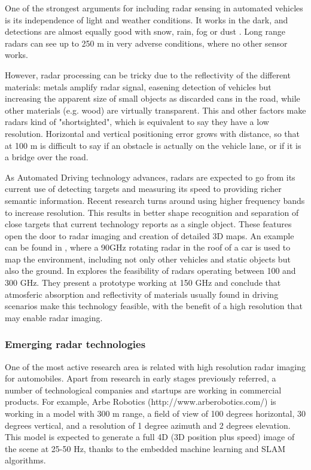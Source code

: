 One of the strongest arguments for including radar sensing in automated 
vehicles is its independence of light and weather conditions. 
It works in the dark, and detections are almost equally good with snow, 
rain, fog or dust \cite{Reina2015}. Long range radars can see up to 250 m
in very adverse conditions, where no other sensor works.

However, radar processing can be tricky due to the reflectivity of the
different materials: metals amplify radar signal, easening detection of 
vehicles but increasing the apparent size of small objects as discarded cans
in the road, while other materials (e.g. wood) are virtually transparent.
This and other factors make radars kind of "shortsighted", which is equivalent 
to say they have a low resolution. Horizontal and vertical positioning error 
grows with distance, so that at 100 m is difficult to say if an obstacle is
actually on the vehicle lane, or if it is a bridge over the road.

As Automated Driving technology advances, radars are expected to go from its
current use of detecting targets and measuring its speed to providing richer
semantic information. 
Recent research turns around using higher frequency bands to increase
resolution. This results in better shape recognition and separation of close
targets that current technology reports as a single object.
These features open the door to radar imaging and creation of detailed 3D maps. 
An example can be found in \cite{Reina2015}, where a 90GHz rotating radar in
the roof of a car is used to map the environment, including not only other
vehicles and static objects but also the ground.
In \cite{Kohler2013} explores the feasibility of radars operating between 
100 and 300 GHz. They present a prototype working at 150 GHz and conclude 
that atmosferic absorption and reflectivity of materials usually found in 
driving scenarios make this technology feasible, with the benefit of a high
resolution that may enable radar imaging.


\subsubsection{Emerging radar technologies}

One of the most active research area is related with high resolution radar
imaging for automobiles. Apart from research in early stages previously 
referred, a number of technological companies and startups are working in 
commercial products. 
For example, Arbe Robotics (http://www.arberobotics.com/) is working in a 
model with 300 m range, a field of view of 100 degrees horizontal, 30 degrees
vertical, and a resolution of 1 degree azimuth and 2 degrees elevation. 
This model is expected to generate a full 4D (3D position plus speed) image of
the scene at 25-50 Hz, thanks to the embedded machine learning and SLAM
algorithms.

